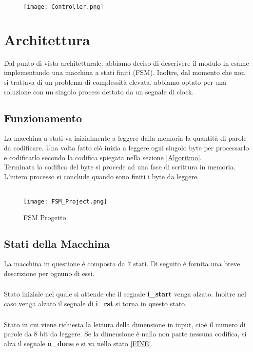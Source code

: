 \documentclass[a4paper]{article}
\begin{document}
\begin{figure}[htp]
    \raggedleft
    \texttt{[image: Controller.png]}
    \label{fig:segnali}
\end{figure}
\clearpage
\section{Architettura}
Dal punto di vista architetturale, abbiamo deciso di descrivere il modulo in esame implementando una macchina a stati finiti (FSM). Inoltre, dal momento che non si trattava di un problema di complessità elevata, abbiamo optato per una soluzione con un singolo process dettato da un segnale di clock.
\subsection{Funzionamento}
La macchina a stati va inizialmente a leggere dalla memoria la quantità di parole da codificare. Una volta fatto ciò inizia a leggere ogni singolo byte per processarlo e codificarlo secondo la codifica spiegata nella sezione \ref{Algoritmo}.\\ 
Terminata la codifica del byte si procede ad una fase di scrittura in memoria. L'intero processo si conclude quando sono finiti i byte da leggere.
\\
\\
\begin{figure}[htp]
    \texttt{[image: FSM\_Project.png]}
    \caption{FSM Progetto}
    \label{fig:FSM_project}
\end{figure}
\clearpage

\subsection{Stati della Macchina}
La macchina in questione è composta da 7 stati. Di seguito è fornita una breve descrizione per ognuno di essi.
\subsubsection{}
Stato iniziale nel quale si attende che il segnale \textbf{i\_start} venga alzato. Inoltre nel caso venga alzato il segnale di \textbf{i\_rst} si torna in questo stato.
\label{INIZIO}
\subsubsection{}
Stato in cui viene richiesta la lettura della dimensione in input, cioè il numero di parole da 8 bit da leggere. Se la dimensione è nulla non parte nessuna codifica, si alza il segnale \textbf{o\_done} e si va nello stato \ref{FINE}.
\label{LETTURA_DIM}
\end{document}
